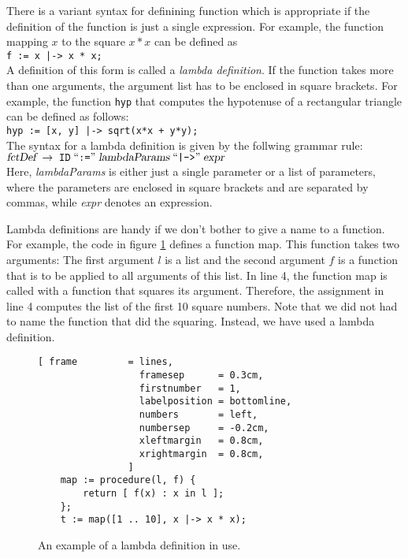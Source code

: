 There is a variant syntax for definining function which is appropriate if the definition of the
function is just a single expression.  For example, the function mapping $x$ to the square
$x*x$ can be defined as
\\[0.2cm]
\hspace*{1.3cm}
\texttt{f := x |-> x * x;}
\\[0.2cm]
A definition of this form is called a \emph{lambda definition}.
If the function takes more than one arguments, the argument list has to be enclosed in square
brackets.  For example, the function \texttt{hyp} that computes the hypotenuse of a rectangular triangle
can be defined as follows:
\\[0.2cm]
\hspace*{1.3cm}
\texttt{hyp := [x, y] |-> sqrt(x*x + y*y);}
\\[0.2cm]
The syntax for a lambda definition is given by the follwing grammar rule:
\\[0.2cm]
\hspace*{1.3cm}
$\textsl{fctDef} \;\rightarrow\; \mathtt{ID} \;\mbox{``\texttt{:=}''}\; \textsl{lambdaParams} \;\mbox{``\texttt{|->}''}\; \textsl{expr}$
\\[0.2cm]
Here, \textsl{lambdaParams} is either just a single parameter or a list of parameters, where the
parameters are enclosed in square brackets and are separated by commas, while
\textsl{expr} denotes an expression.

Lambda definitions are handy if we don't bother to give a name to a function.
For example, the code in figure \ref{fig:lambda.stlx} defines a function map.  This function takes
two arguments: The first argument $l$ is a list and the second argument $f$ is a function that is to
be applied to all arguments of this list.  In line 4, the function map is called with a function
that squares its argument.  Therefore, the assignment in line 4 computes the list of the first 10
square numbers.  Note that we did not had to name the function that did the squaring.  Instead, we
have  used a lambda definition.

\begin{figure}[!ht]
\centering
\begin{Verbatim}[ frame         = lines, 
                  framesep      = 0.3cm, 
                  firstnumber   = 1,
                  labelposition = bottomline,
                  numbers       = left,
                  numbersep     = -0.2cm,
                  xleftmargin   = 0.8cm,
                  xrightmargin  = 0.8cm,
                ]
    map := procedure(l, f) {
        return [ f(x) : x in l ];
    };    
    t := map([1 .. 10], x |-> x * x);
\end{Verbatim}
\vspace*{-0.3cm}
\caption{An example of a lambda definition in use.}
\label{fig:lambda.stlx}
\end{figure}

